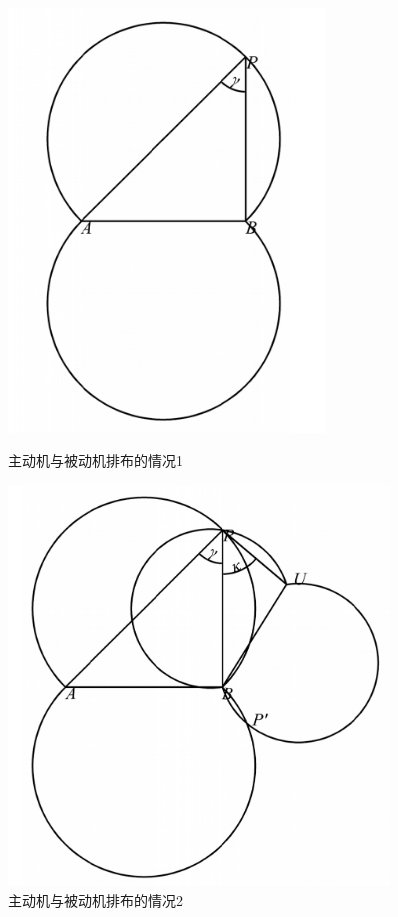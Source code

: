 \documentclass[withoutpreface,bwprint]{cumcmthesis} %
\begin{document}
\begin{figure}[htbp]
    \centering
    \begin{minipage}{0.49\textwidth}
        \centering
        \includegraphics[width=0.75\textwidth]{../../figure/q2_1.png} 
        \caption{主动机与被动机排布的情况1}
        \label{q2_1}
    \end{minipage}
    \begin{minipage}{0.49\textwidth}
        \centering
        \includegraphics[width=0.9\textwidth]{../../figure/q2_2.png} 
        \caption{主动机与被动机排布的情况2}
        \label{q2_2}   
    \end{minipage}
\end{figure}
\end{document}
